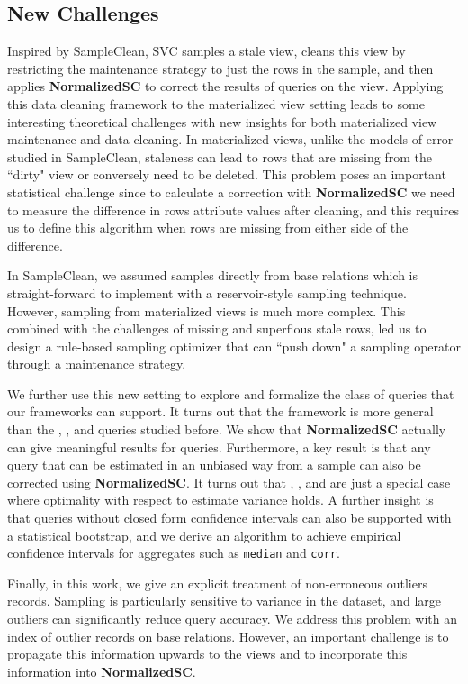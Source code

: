 \subsection{New Challenges}
Inspired by SampleClean, SVC samples a stale view, cleans this view by restricting the maintenance strategy to just the rows in the sample, and then applies \textbf{NormalizedSC} to correct the results of queries on the view.
Applying this data cleaning framework to the materialized view setting leads to some interesting theoretical challenges with new insights for both materialized view maintenance and data cleaning.
In materialized views, unlike the models of error studied in SampleClean, staleness can lead to rows that are missing from the ``dirty" view or conversely need to be deleted.
This problem poses an important statistical challenge since to calculate a correction with \textbf{NormalizedSC} we need to measure the difference in rows attribute values after cleaning, and this requires us to define this algorithm when rows are missing from either side of the difference.

In SampleClean, we assumed samples directly from base relations which is straight-forward to implement with a reservoir-style sampling technique.
However, sampling from materialized views is much more complex.
This combined with the challenges of missing and superflous stale rows, led us to design a rule-based sampling optimizer that can ``push down" a sampling operator through a maintenance strategy.

We further use this new setting to explore and formalize the class of queries that our frameworks can support.
It turns out that the framework is more general than the \sumfunc, \avgfunc, and \countfunc queries studied before.
We show that \textbf{NormalizedSC} actually can give meaningful results for \selectfunc queries.
Furthermore, a key result is that any query that can be estimated in an unbiased way from a sample can also be corrected using \textbf{NormalizedSC}.
It turns out that \sumfunc, \avgfunc, and \countfunc are just a special case where optimality with respect to estimate variance holds.
A further insight is that queries without closed form confidence intervals can also be supported with a statistical bootstrap, and we
derive an algorithm to achieve empirical confidence intervals for aggregates such as \texttt{median} and \texttt{corr}.

Finally, in this work, we give an explicit treatment of non-erroneous outliers records.
Sampling is particularly sensitive to variance in the dataset, and large outliers can significantly reduce query accuracy.
We address this problem with an index of outlier records on base relations.
However, an important challenge is to propagate this information upwards to the views and to incorporate this information into \textbf{NormalizedSC}.





